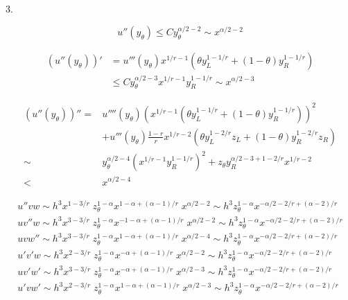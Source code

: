 \documentclass{ctexart}
\begin{document}
3.

\begin{equation}
    u''(y_\theta) \le C y_\theta^{\alpha/2-2} \sim x^{\alpha/2-2}
\end{equation}


\begin{equation}
    \begin{aligned}
        (u''(y_\theta))' &= u'''(y_\theta) x^{1/r-1}(\theta y_L^{1-1/r} + (1-\theta) y_R^{1-1/r})   \\
        & \le C y_\theta^{\alpha/2-3}x^{1/r-1} y_R^{1-1/r} \sim x^{\alpha/2-3}
    \end{aligned}
\end{equation}

\begin{equation}
    \begin{aligned}
        (u''(y_\theta))'' =& u''''(y_\theta) (x^{1/r-1}(\theta y_L^{1-1/r} + (1-\theta) y_R^{1-1/r}))^2 \\
        & + u'''(y_\theta)\frac{1-r}{r} x^{1/r-2}(\theta y_L^{1-2/r}z_L + (1-\theta) y_R^{1-2/r}z_R) \\
        \sim & y_\theta^{\alpha/2-4} (x^{1/r-1} y_R^{1-1/r})^2 + z_\theta y_R^{\alpha/2-3 +1-2/r}x^{1/r-2}  \\
        < & x^{\alpha/2-4}
    \end{aligned}
\end{equation}


\begin{gather}
    u''vw \sim h^3 x^{1-3/r} \; z_\theta^{1-\alpha} x^{1-\alpha + (\alpha-1)/r}\; x^{\alpha/2-2} 
        \sim h^3 z_\theta^{1-\alpha} x^{-\alpha/2-2/r+(\alpha-2)/r}   \\
    uv''w \sim h^3 x^{3-3/r} \; z_\theta^{1-\alpha} x^{-1-\alpha + (\alpha-1)/r} \; x^{\alpha/2-2} 
        \sim h^3z_\theta^{1-\alpha}x^{-\alpha/2-2/r+(\alpha-2)/r}  \\
    uvw'' \sim h^3 x^{3-3/r} \; z_\theta^{1-\alpha} x^{1-\alpha + (\alpha-1)/r} \; x^{\alpha/2-4} 
        \sim h^3z_\theta^{1-\alpha}x^{-\alpha/2-2/r+(\alpha-2)/r}   \\
    u'v'w \sim h^3 x^{2-3/r}\; z_\theta^{1-\alpha} x^{-\alpha + (\alpha-1)/r} \; x^{\alpha/2-2}
        \sim h^3z_\theta^{1-\alpha}x^{-\alpha/2-2/r+(\alpha-2)/r}   \\
    uv'w' \sim h^3 x^{3-3/r} \; z_\theta^{1-\alpha} x^{-\alpha + (\alpha-1)/r} \; x^{\alpha/2-3}
        \sim h^3z_\theta^{1-\alpha}x^{-\alpha/2-2/r+(\alpha-2)/r}   \\
    u'vw' \sim h^3 x^{2-3/r}\;  z_\theta^{1-\alpha} x^{1-\alpha + (\alpha-1)/r} \; x^{\alpha/2-3}
        \sim h^3z_\theta^{1-\alpha}x^{-\alpha/2-2/r+(\alpha-2)/r}
\end{gather}
\end{document}
